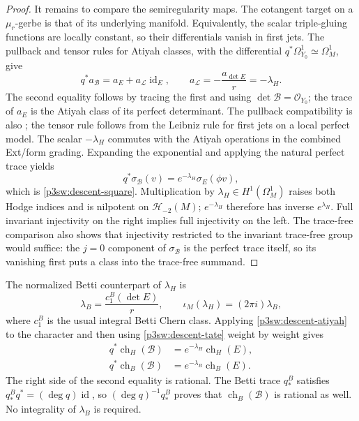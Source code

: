 \documentclass[11pt]{article}
\numberwithin{equation}{section}
\begin{document}
\begin{proof}
It remains to compare the semiregularity maps.  The cotangent target
on a \(\mu_r\)-gerbe is that of its underlying manifold.  Equivalently,
the scalar triple-gluing functions are locally constant, so their
differentials vanish in first jets.  The pullback and tensor rules for
Atiyah classes, with the differential
\(q^*\Omega_{Y_0}^1\simeq\Omega_M^1\), give
\begin{equation}
\label{p3sw:descent-atiyah}
 q^*a_{\mathcal B}=a_E+a_{\mathcal L}\operatorname{id}_E,
 \qquad
 a_{\mathcal L}=-\frac{a_{\det E}}r=-\lambda_H.
\end{equation}
The second equality follows by tracing the first and using
\(\det\mathcal B=\mathcal O_{Y_0}\); the trace of \(a_E\) is the
Atiyah class of its perfect determinant.  The pullback compatibility is also
\cite[Proposition~3.14]{P3SWBuchweitzFlenner2003}; the tensor rule
follows from the Leibniz rule for first jets on a local perfect model.
The scalar \(-\lambda_H\) commutes with the Atiyah operations in the
combined Ext/form grading.  Expanding the exponential and applying the
natural perfect trace yields
\[
 q^*\sigma_{\mathcal B}(v)
     =e^{-\lambda_H}\sigma_E(\phi v),
\]
which is \eqref{p3sw:descent-square}.  Multiplication by
\(\lambda_H\in H^1(\Omega_M^1)\) raises both Hodge indices and is
nilpotent on \(\mathcal H_{-2}(M)\); \(e^{-\lambda_H}\) therefore
has inverse \(e^{\lambda_H}\).  Full invariant injectivity on the
right implies full injectivity on the left.  The trace-free comparison
also shows that injectivity restricted to the invariant trace-free
group would suffice: the \(j=0\) component of \(\sigma_{\mathcal B}\)
is the perfect trace itself, so its vanishing first puts a class into
the trace-free summand.
\end{proof}

The normalized Betti counterpart of \(\lambda_H\) is
\[
 \lambda_B=\frac{c_1^{B}(\det E)}r,\qquad
 \iota_M(\lambda_H)=(2\pi i)\lambda_B,
\]
where \(c_1^B\) is the usual integral Betti Chern class.  Applying
\eqref{p3sw:descent-atiyah} to the character and then using
\eqref{p3sw:descent-tate} weight by weight gives
\begin{equation}
\label{p3sw:descent-character-pullback}
 \begin{split}
 q^*\operatorname{ch}_H(\mathcal B)
   &=e^{-\lambda_H}\operatorname{ch}_H(E),\\
 q^*\operatorname{ch}_B(\mathcal B)
   &=e^{-\lambda_B}\operatorname{ch}_B(E).
 \end{split}
\end{equation}
The right side of the second equality is rational.  The Betti trace
\(q_*^B\) satisfies \(q_*^Bq^*=(\deg q)\operatorname{id}\), so
\((\deg q)^{-1}q_*^B\) proves that
\(\operatorname{ch}_B(\mathcal B)\) is rational as well.  No
integrality of \(\lambda_B\) is required.
\end{document}
